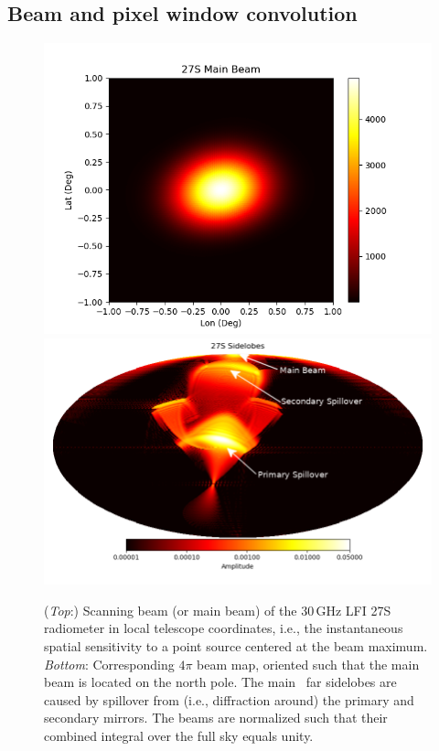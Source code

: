 \documentclass[twocolumn]{aa}
\begin{document}
\subsection{Beam and pixel window convolution}
\label{sec:beam}

\begin{figure}[t]
  \center
  \includegraphics[width=\linewidth]{figs/beam_27S_cartesian.png}\\
  \includegraphics[width=\linewidth]{figs/sl_27_S_ps.png}
  \caption{(\emph{Top}:) Scanning beam (or main beam) of the 30\,GHz
    LFI 27S radiometer in local telescope coordinates, i.e., the
    instantaneous spatial sensitivity to a point source
    centered at the beam maximum.  {\emph{Bottom}:} Corresponding
    $4\pi$ beam map, oriented such that the main beam is located on
    the north pole. The main \Planck\ far sidelobes are caused by
    spillover from (i.e., diffraction around) the primary and
    secondary mirrors. The beams are normalized such that their
    combined integral over the full sky equals unity. }
  \label{fig:beam_LFI}
\end{figure}
\end{document}
